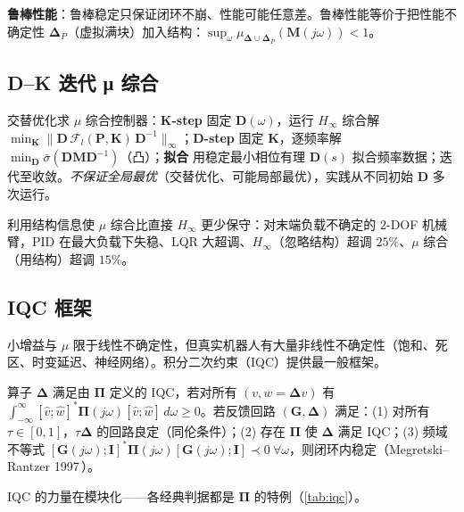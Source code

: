 \textbf{鲁棒性能}：鲁棒稳定只保证闭环不崩、性能可能任意差。鲁棒性能等价于把性能不确定性 $\boldsymbol\Delta_P$（虚拟满块）加入结构：$\sup_\omega\mu_{\boldsymbol\Delta\cup\boldsymbol\Delta_P}(\mathbf M(j\omega))<1$。

\subsection{D--K 迭代 μ 综合}
\begin{algo}[D--K 迭代]
\label{alg:dk}
交替优化求 $\mu$ 综合控制器：\textbf{K-step} 固定 $\mathbf D(\omega)$，运行 $H_\infty$ 综合解 $\min_{\mathbf K}\|\mathbf D\,\mathcal F_l(\mathbf P,\mathbf K)\,\mathbf D^{-1}\|_\infty$；\textbf{D-step} 固定 $\mathbf K$，逐频率解 $\min_{\mathbf D}\bar\sigma(\mathbf D\mathbf M\mathbf D^{-1})$（凸）；\textbf{拟合} 用稳定最小相位有理 $\mathbf D(s)$ 拟合频率数据；迭代至收敛。\emph{不保证全局最优}（交替优化、可能局部最优），实践从不同初始 $\mathbf D$ 多次运行。
\end{algo}

利用结构信息使 $\mu$ 综合比直接 $H_\infty$ 更少保守：对末端负载不确定的 2-DOF 机械臂，PID 在最大负载下失稳、LQR 大超调、$H_\infty$（忽略结构）超调 $25\%$、$\mu$ 综合（用结构）超调 $15\%$。

\subsection{IQC 框架}
小增益与 $\mu$ 限于线性不确定性，但真实机器人有大量非线性不确定性（饱和、死区、时变延迟、神经网络）。积分二次约束（IQC）提供最一般框架。

\begin{theorem}
\label{thm:iqc}
算子 $\boldsymbol\Delta$ 满足由 $\boldsymbol\Pi$ 定义的 IQC，若对所有 $(v,w=\boldsymbol\Delta v)$ 有 $\int_{-\infty}^\infty[\hat v;\hat w]^*\boldsymbol\Pi(j\omega)[\hat v;\hat w]\,d\omega\ge0$。若反馈回路 $(\mathbf G,\boldsymbol\Delta)$ 满足：(1) 对所有 $\tau\in[0,1]$，$\tau\boldsymbol\Delta$ 的回路良定（同伦条件）；(2) 存在 $\boldsymbol\Pi$ 使 $\boldsymbol\Delta$ 满足 IQC；(3) 频域不等式 $[\mathbf G(j\omega);\mathbf I]^*\boldsymbol\Pi(j\omega)[\mathbf G(j\omega);\mathbf I]\prec0\ \forall\omega$，则闭环内稳定（Megretski--Rantzer 1997\,\cite{megretski1997iqc}）。
\end{theorem}

IQC 的力量在模块化——各经典判据都是 $\boldsymbol\Pi$ 的特例（\cref{tab:iqc}）。

